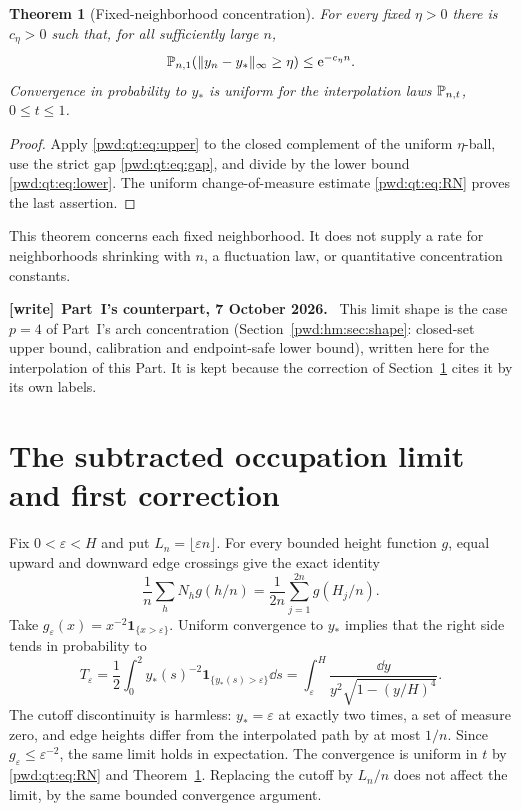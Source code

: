 \documentclass[11pt,letterpaper]{article}
\numberwithin{equation}{section}
\newtheorem{theorem}{Theorem}[section]
\theoremstyle{remark}\newtheorem{remark}[theorem]{Remark}
\newenvironment{writenote}[1][]{\par\smallskip\begingroup\small
 \noindent\textbf{[write]}\if\relax\detokenize{#1}\relax\else~\textbf{#1.}\fi\ }%
 {\par\endgroup\smallskip}
\begin{document}
\begin{theorem}[Fixed-neighborhood concentration]\label{pwd:qt:thm:shape}
For every fixed $\eta>0$ there is $c_\eta>0$ such that, for all sufficiently large $n$,
\begin{equation}\label{pwd:qt:eq:concentration}
 \mathbb P_{n,1}(\|y_n-y_*\|_\infty\ge\eta)\le\mathrm e^{-c_\eta n}.
\end{equation}
Convergence in probability to $y_*$ is uniform for the interpolation laws $\mathbb P_{n,t}$, $0\le t\le1$.
\end{theorem}
\begin{proof}
Apply \eqref{pwd:qt:eq:upper} to the closed complement of the uniform $\eta$-ball, use the strict gap \eqref{pwd:qt:eq:gap}, and divide by the lower bound \eqref{pwd:qt:eq:lower}. The uniform change-of-measure estimate \eqref{pwd:qt:eq:RN} proves the last assertion.
\end{proof}
This theorem concerns each fixed neighborhood. It does not supply a rate for neighborhoods shrinking with $n$, a fluctuation law, or quantitative concentration constants.

\begin{writenote}[Part~I's counterpart, 7 October 2026]
This limit shape is the case $p=4$ of Part~I's arch concentration
(Section~\ref{pwd:hm:sec:shape}: closed-set upper bound, calibration and
endpoint-safe lower bound), written here for the interpolation of this Part.
It is kept because the correction of Section~\ref{pwd:qt:sec:correction}
cites it by its own labels.
\end{writenote}

\section{The subtracted occupation limit and first correction}\label{pwd:qt:sec:correction}
Fix $0<\varepsilon<H$ and put $L_n=\lfloor\varepsilon n\rfloor$. For every bounded height function $g$, equal upward and downward edge crossings give the exact identity
\begin{equation}\label{pwd:qt:eq:occupation-functional}
 \frac1n\sum_hN_hg(h/n)=\frac1{2n}\sum_{j=1}^{2n}g(H_j/n).
\end{equation}
Take $g_\varepsilon(x)=x^{-2}\mathbf1_{\{x>\varepsilon\}}$. Uniform convergence to $y_*$ implies that the right side tends in probability to
\begin{equation}\label{pwd:qt:eq:Teps}
 T_\varepsilon=\frac12\int_0^2y_*(s)^{-2}
                   \mathbf1_{\{y_*(s)>\varepsilon\}}\dd s
 =\int_\varepsilon^H\frac{\dd y}{y^2\sqrt{1-(y/H)^4}}.
\end{equation}
The cutoff discontinuity is harmless: $y_* =\varepsilon$ at exactly two times, a set of measure zero, and edge heights differ from the interpolated path by at most $1/n$. Since $g_\varepsilon\le\varepsilon^{-2}$, the same limit holds in expectation. The convergence is uniform in $t$ by \eqref{pwd:qt:eq:RN} and Theorem~\ref{pwd:qt:thm:shape}. Replacing the cutoff by $L_n/n$ does not affect the limit, by the same bounded convergence argument.
\end{document}
